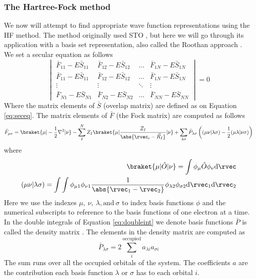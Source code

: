 \documentclass[../master_thesis.tex]{subfiles}
\begin{document}
\subsubsection{The Hartree-Fock method}
We now will attempt to find appropriate wave function representations using the \ac{HF} method.
The method originally used \ac{STO} \cite{Cramer:2004}, but here we will
go through its application with a basis set representation, also called the Roothan approach
\cite{Cramer:2004, Helgaker:2012}.
We set a secular equation as follows
\begin{equation}\label{eq:fockseceq}
  \begin{vmatrix}
    \bar{F}_{11} - E\bar{S}_{11} & \bar{F}_{12} - E\bar{S}_{12} & \ldots & \bar{F}_{1N} - E\bar{S}_{1N} \\
    \bar{F}_{11} - E\bar{S}_{11} & \bar{F}_{12} - E\bar{S}_{12} & \ldots & \bar{F}_{1N} - E\bar{S}_{1N} \\
    \vdots & \vdots & \ddots & \vdots\\
    \bar{F}_{N1} - E\bar{S}_{N1} & \bar{F}_{N2} - E\bar{S}_{N2} & \ldots & \bar{F}_{NN} - E\bar{S}_{NN}
  \end{vmatrix} = 0
\end{equation}
Where the matrix elements of $\bar{S}$ (overlap matrix) are defined as on Equation
\ref{eq:seceq}. The matrix elements of $\bar{F}$ (the Fock matrix) are computed
as follows \cite{Cramer:2004}
\begin{equation}\label{eq:Fockmatrix}
  \bar{F}_{\mu\nu} = \braket{\mu|-\frac{1}{2}\nabla^2|\nu}
  - \sum^N_IZ_I\braket{\mu|\frac{Z_I}{\abs{\rvec_i
  - \vec{R}_I}}|\nu} + \sum_{\lambda\sigma} \bar{P}_{\lambda \sigma}\left( (\mu\nu|\lambda\sigma) - \frac{1}{2}(\mu\lambda|\nu\sigma) \right)
\end{equation}
where
\begin{align}\label{eq:doubleint}
  \braket{\mu|\hat{O}| \nu} = \int\phi_{\mu}\hat{O}\phi_{\nu}\text{d}\rvec\\
  (\mu\nu|\lambda\sigma) = \int\int\phi_{\mu1}\phi_{\nu1}\frac{1}{\abs{\rvec_1 - \rvec_2}}\phi_{\lambda2}\phi_{\sigma2} \text{d}\rvec_1\text{d}\rvec_2
\end{align}
Here we use the indexes $\mu,\ \nu,\ \lambda, \text{and}\ \sigma$ to index basis
functions $\phi$ and the numerical subscripts to reference to the basis functions
of one electron at a time.
In the double integrals of Equation \ref{eq:doubleint} we denote basis functions
$\bar{P}$ is called the density matrix \cite{Cramer:2004}. The elements in the
density matrix are computed as \cite{Cramer:2004}
\begin{equation}
  \bar{P}_{\lambda\sigma} = 2 \sum_i^{\text{occupied}}a_{\lambda i}a_{\sigma i}
\end{equation}
The sum runs over all the occupied orbitals of the system. The coefficients $a$
are the contribution each basis function $\lambda$ or $\sigma$ has to each orbital $i$.
\end{document}
